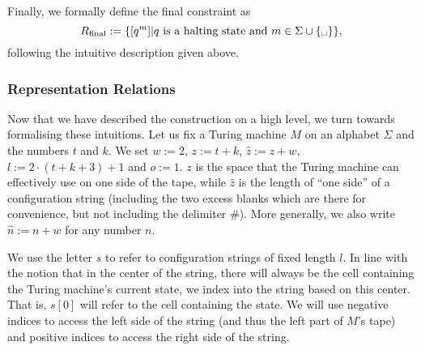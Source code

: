 \documentclass[a4paper,UKenglish,cleveref, autoref]{lipics-v2019}
\newcommand{\Rfinal}{R_{\text{final}}}
\begin{document}
Finally, we formally define the final constraint as 
\[\Rfinal := \{[q^m] | q \text{ is a halting state and } m \in \Sigma \cup \{\blank\}\}, \]
following the intuitive description given above.

\subsubsection{Representation Relations}
Now that we have described the construction on a high level, we turn towards formalising these intuitions. 
Let us fix a Turing machine $M$ on an alphabet $\Sigma$ and the numbers $t$ and $k$. We set $w := 2$, $z := t + k$, $\hat{z} := z + w$, $l := 2\cdot (t + k + 3) + 1$ and $o := 1$. $z$ is the space that the Turing machine can effectively use on one side of the tape, while $\hat{z}$ is the length of ``one side'' of a configuration string (including the two excess blanks which are there for convenience, but not including the delimiter \#).  
More generally, we also write $\hat{n} := n + w$ for any number $n$. 

We use the letter $s$ to refer to configuration strings of fixed length $l$. 
In line with the notion that in the center of the string, there will always be the cell containing the Turing machine's current state, we index into the string based on this center. 
That is, $s[0]$ will refer to the cell containing the state. 
We will use negative indices to access the left side of the string (and thus the left part of $M$'s tape) and positive indices to access the right side of the string.
 
\begin{center}
\end{center}
\end{document}
